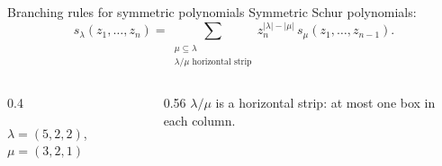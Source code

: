 \documentclass[10pt]{beamer}
\begin{document}
\begin{frame}{Branching rules for symmetric polynomials}
Symmetric Schur polynomials:
\[
s_\lambda(z_1,\dots,z_n)=\sum_{\substack{\mu\subseteq\lambda\\ \lambda/\mu\text{ horizontal strip}}} z_n^{|\lambda|-|\mu|}\,s_\mu(z_1,\dots,z_{n-1}).
\]
\begin{columns}[c]
\begin{column}{0.4\textwidth}
\centering
{}

\smallskip
{\small $\lambda=(5,2,2)$, $\mu=(3,2,1)$}
\end{column}
\begin{column}{0.56\textwidth}
$\lambda/\mu$ is a horizontal strip: at most one box in each column.
\end{column}
\end{columns}

\end{frame}
\end{document}
